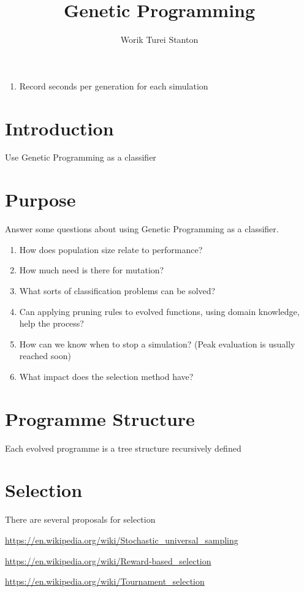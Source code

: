 \documentclass[a4paper,twoside]{article}
\title{Genetic Programming}
\author{Worik Turei Stanton}
\begin{document}
\begin{enumerate}
  \item Record seconds per generation for each simulation
\end{enumerate}

\section{Introduction}

Use Genetic Programming as a classifier



\section{Purpose}
Answer some questions about using Genetic Programming as a classifier.

\begin{enumerate}
\item How does population size relate to performance?
\item How much need is there for mutation?
\item What sorts of classification problems can be solved?
\item Can applying pruning rules to evolved functions, using domain
  knowledge, help the process?
\item How can we know when to stop a simulation? (Peak evaluation is
  usually reached soon)
 
\item What impact does the selection method have?
\end{enumerate}

\section{Programme Structure}

Each evolved programme is a tree structure recursively defined 


\section{Selection}

There are several proposals for selection

\url{https://en.wikipedia.org/wiki/Stochastic_universal_sampling}

\url{https://en.wikipedia.org/wiki/Reward-based_selection}

\url{https://en.wikipedia.org/wiki/Tournament_selection}
\end{document}

